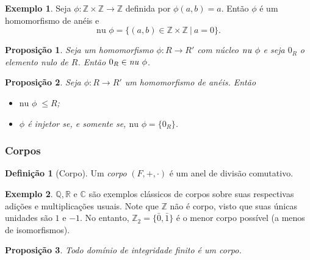 \documentclass[a4paper,12pt]{report}
\theoremstyle{plain}
\newtheorem{proposicao}{Proposição}[section]
\theoremstyle{definition}
\newtheorem{definicao}{Definição}[section]
\newtheorem{exemplo}{Exemplo}[section]
\begin{document}
	\begin{exemplo}
		Seja $\phi: \mathbb{Z}\times \mathbb{Z} \longrightarrow \mathbb{Z}$ definida por $\phi(a,b) = a$. Então $\phi$ é um homomorfismo de anéis e
		$$\text{nu }\phi = \{(a,b) \in \mathbb{Z}\times \mathbb{Z} \ | \ a = 0\}.$$
	\end{exemplo}
	
	\begin{proposicao}
		Seja um homomorfismo $\phi:R\longrightarrow R'$ com núcleo $\text{\emph{nu} }\phi$ e seja $0_R$ o elemento nulo de $R$. Então $0_R \in \text{\emph{nu} }\phi$.
	\end{proposicao}
	
	\begin{proposicao}
		Seja $\phi: R \longrightarrow R'$ um homomorfismo de anéis. Então 
		\begin{itemize}
			\item $\text{nu } \phi\; \leq R$;
			\item $\phi$ é injetor se, e somente se, $\text{nu }\phi = \{0_R\}$.
		\end{itemize}
	\end{proposicao}
	
	
	\subsubsection{Corpos}
	
	\begin{definicao}[Corpo]
		Um \textit{corpo} $(F, +, \cdot)$ é um anel de divisão comutativo.
	\end{definicao}
	
	\begin{exemplo}
		$\mathbb{Q}, \mathbb{R}$ e $\mathbb{C}$ são exemplos clássicos de corpos sobre suas respectivas adições e multiplicações usuais.
		Note que $\mathbb{Z}$ não é corpo, visto que suas únicas unidades são $1$ e $-1$. 
		No entanto, $\mathbb{Z}_2 = \{\bar 0,\bar 1\}$ é o menor corpo possível (a menos de isomorfismos).
	\end{exemplo}
	
	\begin{proposicao}
		Todo domínio de integridade finito é um corpo.
	\end{proposicao} %
	
\end{document}
